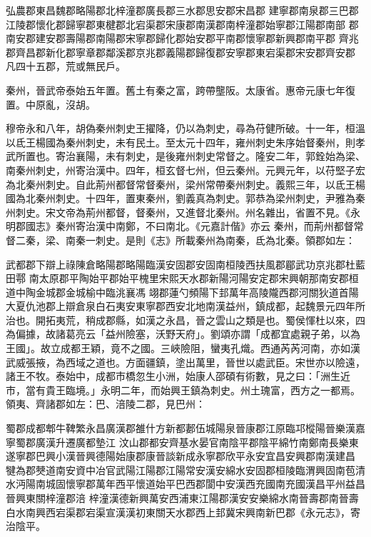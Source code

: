 \begin{pinyinscope}
 弘農郡東昌魏郡略陽郡北梓潼郡廣長郡三水郡思安郡宋昌郡
 建寧郡南泉郡三巴郡江陵郡懷化郡歸寧郡東楗郡北宕渠郡宋康郡南漢郡南梓潼郡始寧郡江陽郡南部
 郡南安郡建安郡壽陽郡南陽郡宋寧郡歸化郡始安郡平南郡懷寧郡新興郡南平郡
 齊兆郡齊昌郡新化郡寧章郡鄰溪郡京兆郡義陽郡歸復郡安寧郡東宕渠郡宋安郡齊安郡
 凡四十五郡，荒或無民戶。



 秦州，晉武帝泰始五年置。舊土有秦之富，跨帶壟阪。太康省。惠帝元康七年復置。中原亂，沒胡。



 穆帝永和八年，胡偽秦州刺史王擢降，仍以為刺史，尋為苻健所破。十一年，桓溫以氐王楊國為秦州刺史，未有民土。至太元十四年，雍州刺史朱序始督秦州，則孝武所置也。寄治襄陽，未有刺史，是後雍州刺史常督之。隆安二年，郭銓始為梁、南秦州刺史，州寄治漢中。四年，桓玄督七州，但云秦州。元興元年，以苻堅子宏為北秦州刺史。自此荊州都督常督秦州，梁州常帶秦州刺史。義熙三年，以氐王楊國為北秦州刺史。十四年，置東秦州，劉義真為刺史。郭恭為梁州刺史，尹雅為秦州刺史。宋文帝為荊州都督，督秦州，又進督北秦州。州名雜出，省置不見。《永明郡國志》秦州寄治漢中南鄭，不曰南北。《元嘉計偕》亦云
 秦州，而荊州都督常督二秦，梁、南秦一刺史。是則《志》所載秦州為南秦，氐為北秦。領郡如左：



 武都郡下辯上祿陳倉略陽郡略陽臨漢安固郡安固南桓陵西扶風郡郿武功京兆郡杜藍田鄠
 南太原郡平陶始平郡始平槐里宋熙天水郡新陽河陽安定郡宋興朝那南安郡桓道中陶金城郡金城榆中臨洮襄馮
 翊郡蓮勺頻陽下邽萬年高陵隴西郡河關狄道首陽大夏仇池郡上辯倉泉白石夷安東寧郡西安北地南漢益州，鎮成都，起魏景元四年所治也。開拓夷荒，稍成郡縣，如漢之永昌，晉之雲山之類是也。蜀侯惲杜以來，四為偏據，故諸葛亮云「益州險塞，沃野天府」。劉頌亦謂「成都宜處親子弟，以為王國」。故立成都王穎，竟不之國。三峽險阻，蠻夷孔熾。西通芮芮河南，亦如漢
 武威張掖，為西域之道也。方面疆鎮，塗出萬里，晉世以處武臣。宋世亦以險遠，諸王不牧。泰始中，成都市橋忽生小洲，始康人邵碩有術數，見之曰：「洲生近市，當有貴王臨境。」永明二年，而始興王鎮為刺史。州土瑰富，西方之一都焉。領夷、齊諸郡如左：巴、涪陵二郡，見巴州：



 蜀郡成都郫牛鞞繁永昌廣漢郡雒什方新都郪伍城陽泉晉康郡江原臨邛樅陽晉樂漢嘉寧蜀郡廣漢升遷廣都墊江
 汶山郡都安齊基水晏官南陰平郡陰平綿竹南鄭南長樂東遂寧郡巴興小漢晉興德陽始康郡康晉談新成永寧郡欣平永安宜昌安興郡南漢建昌
 犍為郡僰道南安資中冶官武陽江陽郡江陽常安漢安綿水安固郡桓陵臨渭興固南苞清水沔陽南城固懷寧郡萬年西平懷道始平巴西郡閬中安漢西充國南充國漢昌平州益昌晉興東關梓潼郡涪
 梓潼漢德新興萬安西浦東江陽郡漢安安樂綿水南晉壽郡南晉壽白水南興西宕渠郡宕渠宣漢漢初東關天水郡西上邽冀宋興南新巴郡《永元志》，寄治陰平。




\end{pinyinscope}
